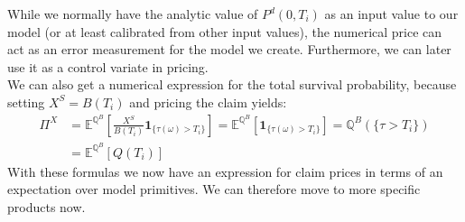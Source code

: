 \documentclass[12pt]{article}
\begin{document}
	While we normally have the analytic value of $P^d(0, T_i)$ as an input value to our model (or at least calibrated from other input values), the numerical price can act as an error measurement for the model we create. Furthermore, we can later use it as a control variate in pricing.\\
	We can also get a numerical expression for the total survival probability, because setting
	$X^S = B(T_i)$ and pricing the claim yields:
	\begin{align*}
		\Pi^X &= \mathbb{E}^{\mathbb{Q}^B}\left[ \frac{X^S}{B(T_i)} \mathbf{1}_{\{\tau(\omega) > T_i\}}\right] = \mathbb{E}^{\mathbb{Q}^B}\left[ \mathbf{1}_{\{\tau(\omega) > T_i\}}\right]
		= \mathbb{Q}^B(\{\tau > T_i\})\\
		&= \mathbb{E}^{\mathbb{Q}^B}\left[ Q(T_i)\right]
	\end{align*}
	With these formulas we now have an expression for claim prices in terms of an expectation over model primitives. We can therefore move to more specific products now.
	
\end{document}

